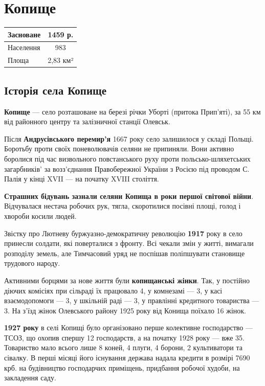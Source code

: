 \section {Копище}
\begin{center}
	\begin{tabular}{| l | c |}
		\hline
		Засноване  & 1459 р.\\ 
		\hline
		Населення & 983 \\ 
		\hline 
		Площа & 2,83 км² \\   
		\hline
	\end{tabular}
\end{center}

\subsection{Історія села Копище}

\textbf{Копище} — село розташоване на березі річки Уборті (притока Прип’яті), за 55 км від районного центру та залізничної станції Олевськ.

Після \textbf{Андрусівського перемир’я} 1667 року село залишилося у складі Польщі. Боротьбу проти своїх поневолювачів селяни не припиняли. Вони активно боролися під час визвольного повстанського руху проти польсько-шляхетських загарбників’ за возз’єднання Правобережної України з Росією під проводом С. Палія у кінці XVII — на початку XVIII століття.

\textbf{Страшних бідувань зазнали селяни Копища в роки першої світової війни}. Відчувалася нестача робочих рук, тягла, скоротилися посівні площі, голод і хвороби косили людей.

Звістку про Лютневу буржуазно-демократичну революцію \textbf{1917} року в село принесли солдати, які поверталися з фронту. Всі чекали змін у житті, вимагали розподілу земель, але Тимчасовий уряд не поспішав поліпшувати становище трудового народу.

Активними борцями за нове життя були \textbf{копищанські жінки}. Так, у постійно діючих комісіях при сільраді їх працювало 4, у комнезамі — 3, у касі взаємодопомоги — 3, у шкільній раді — 3, у правлінні кредитного товариства — 3. На з’їзд жінок Олевського району 1925 року від Конища поїхало 16 жінок.

\textbf{1927 року} в селі Копищі було організовано перше колективне господарство — ТСОЗ, що охопив спершу 12 господарств, а на початку 1928 року — вже 35. Товариство мало всього лише 8 коней, 4 плуги, 4 борони, 2 культиватори та сівалку. В перші місяці його існування держава надала кредити в розмірі 7690 крб. на будівництво господарчих приміщень, придбання робочої худоби, на закладення саду.


